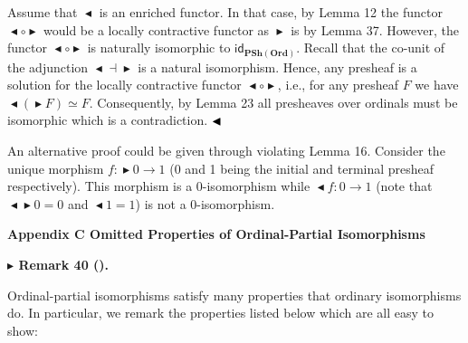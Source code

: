 \documentclass[10pt,a4paper]{article}
\begin{document}
 
Assume that $\mathop{\blacktriangleleft}$ is an enriched functor. In that case, by Lemma 12 the functor $\mathop{\blacktriangleleft}\circ\mathop{\blacktriangleright}$ would be a locally contractive functor as $\mathop{\blacktriangleright}$ is by Lemma 37. However, the functor $\mathop{\blacktriangleleft}\circ\mathop{\blacktriangleright}$ is naturally isomorphic to $\mathsf{id}_{\mathbf{PSh}(\mathbf{Ord})}$. Recall that the co-unit of the adjunction $\mathop{\blacktriangleleft}\dashv\mathop{\blacktriangleright}$ is a natural isomorphism. Hence, any presheaf is a solution for the locally contractive functor $\mathop{\blacktriangleleft}\circ\mathop{\blacktriangleright}$, i.e., for any presheaf $F$ we have $\mathop{\blacktriangleleft}(\mathop{\blacktriangleright}F)\simeq F$. Consequently, by Lemma 23 all presheaves over ordinals must be isomorphic which is a contradiction. $\hfill\blacktriangleleft$\par
 
 
 
An alternative proof could be given through violating Lemma 16. Consider the unique morphism $f:\mathop{\blacktriangleright}0\to 1$ (0 and 1 being the initial and terminal presheaf respectively). This morphism is a $0$-isomorphism while $\mathop{\blacktriangleleft}f:0\to 1$ (note that $\mathop{\blacktriangleleft}\mathop{\blacktriangleright}0=0$ and $\mathop{\blacktriangleleft}1=1$) is not a 0-isomorphism.\par
 
 
 


 
\par\medskip\noindent\textbf{Appendix C Omitted Properties of Ordinal-Partial Isomorphisms}\par
 
 
\par\medskip\noindent\textbf{$\blacktriangleright$ Remark 40 ().}\par
 
 
Ordinal-partial isomorphisms satisfy many properties that ordinary isomorphisms do. In particular, we remark the properties listed below which are all easy to show:\par
  
\end{document}
